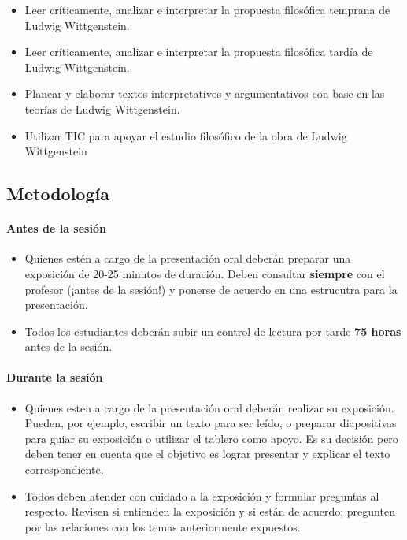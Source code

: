 \documentclass[spanish,]{article}
\let\oldparagraph\paragraph
\renewcommand{\paragraph}[1]{\oldparagraph{#1}\mbox{}}
\begin{document}
\begin{itemize}
\item
  Leer críticamente, analizar e interpretar la propuesta filosófica
  temprana de Ludwig Wittgenstein.
\item
  Leer críticamente, analizar e interpretar la propuesta filosófica
  tardía de Ludwig Wittgenstein.
\item
  Planear y elaborar textos interpretativos y argumentativos con base en
  las teorías de Ludwig Wittgenstein.
\item
  Utilizar TIC para apoyar el estudio filosófico de la obra de Ludwig
  Wittgenstein
\end{itemize}

\subsection{Metodología}\label{metodologia}

\paragraph{\texorpdfstring{\textbf{Antes de la
sesión}}{Antes de la sesión}}\label{antes-de-la-sesion}

\begin{itemize}
\item
  Quienes estén a cargo de la presentación oral deberán preparar una
  exposición de 20-25 minutos de duración. Deben consultar
  \textbf{siempre} con el profesor (¡antes de la sesión!) y ponerse de
  acuerdo en una estrucutra para la presentación.
\item
  Todos los estudiantes deberán subir un control de lectura por tarde
  \textbf{75 horas} antes de la sesión.
\end{itemize}

\paragraph{\texorpdfstring{\textbf{Durante la
sesión}}{Durante la sesión}}\label{durante-la-sesion}

\begin{itemize}
\item
  Quienes esten a cargo de la presentación oral deberán realizar su
  exposición. Pueden, por ejemplo, escribir un texto para ser leído, o
  preparar diapositivas para guiar su exposición o utilizar el tablero
  como apoyo. Es su decisión pero deben tener en cuenta que el objetivo
  es lograr presentar y explicar el texto correspondiente.
\item
  Todos deben atender con cuidado a la exposición y formular preguntas
  al respecto. Revisen si entienden la exposición y si están de acuerdo;
  pregunten por las relaciones con los temas anteriormente expuestos.
\end{itemize}
\end{document}
